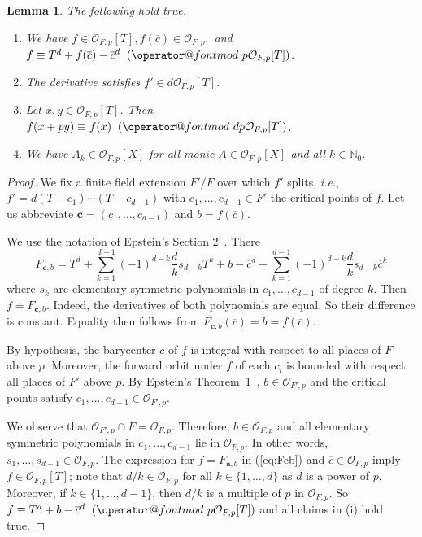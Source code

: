 \documentclass[12pt,oneside,a4]{amsart}
\makeatletter
\newcommand{\IN}{\mathbb{N}}
\newcommand{\cO}{\mathcal{O}}
\newcounter{maincounter}
\numberwithin{maincounter}{section}
\numberwithin{equation}{section}
\newtheorem{lemma}[maincounter]{Lemma}
\def\imod#1{\allowbreak\mkern10mu({\operator@font mod}\,\,#1)}
\makeatother
\begin{document}
\begin{lemma}
  \label{lem:epstein}
  The following hold true.
  \begin{enumerate}
  \item [(i)]  We have $f\in \cO_{F,p}[T], f(\overline c)\in
    \cO_{F,p},$     and $f\equiv T^d+ f(\overline c)- \overline c^d
    \imod {p \cO_{F,p}[T]}$.
  \item[(ii)] The derivative satisfies $f' \in d \cO_{F,p}[T]$. 
  \item[(iii)] Let $x,y\in \cO_{F,p}[T]$. Then $f(x+py) \equiv f(x) \imod{dp
      \cO_{F,p}[T]}$. 
  \item[(iv)] We have
    $A_k\in \cO_{F,p}[X]$ for all monic $A\in \cO_{F,p}[X]$ and
    all $k\in\IN_0$.
  \end{enumerate}
\end{lemma}
\begin{proof}
  We fix a finite field extension $F'/F$ over which $f'$ splits,
  \textit{i.e.}, $f' = d(T-c_1)\cdots(T-c_{d-1})$ with
  $c_1,\ldots,c_{d-1}\in F'$ the critical points of $f$.
  Let us abbreviate $\mathbf{c}=(c_1,\ldots,c_{d-1})$ and
  $b=f(\overline{c})$.
  
  We use the notation of Epstein's Section 2~\cite{epstein:12}. 
  There
  \begin{equation}
    \label{eq:Fcb}
    F_{\mathbf{c},b} = T^d + \sum_{k=1}^{d-1} (-1)^{d-k}
    \frac{d}{k}s_{d-k} T^k +
    b - \overline{c}^d - \sum_{k=1}^{d-1} (-1)^{d-k}
    \frac{d}{k}s_{d-k} \overline{c}^k
  \end{equation}
  where $s_{k}$ are elementary symmetric polynomials in
  $c_1,\ldots,c_{d-1}$ of  degree $k$.
  Then $f = F_{\mathbf{c},b}$.
  Indeed, the derivatives of both polynomials
  are equal. So their difference is
  constant. Equality then follows from  $F_{\mathbf{c},b}(\overline
  c)=b=f(\overline c)$.
  
  By hypothesis, the barycenter $\overline c$ of $f$
  is integral with respect to all places
  of $F$ above $p$. Moreover, the forward
  orbit under $f$ of each $c_i$ is bounded with
  respect all  places of $F'$ above $p$.
  By Epstein's Theorem~1~\cite{epstein:12},
  $b\in \cO_{F',p}$ and the critical points satisfy
  $c_1,\ldots,c_{d-1}\in\cO_{F',p}$.

  We observe that $\cO_{F',p}\cap F = \cO_{F,p}$. Therefore, $b\in
  \cO_{F,p}$ and all elementary symmetric polynomials in
  $c_1,\ldots,c_{d-1}$ lie in $\cO_{F,p}$. In other words,
  $s_1,\ldots,s_{d-1}\in\cO_{F,p}$.  The expression for
  $f=F_{\mathbf{a},b}$ in (\ref{eq:Fcb}) and $\overline c\in \cO_{F,p}$
  imply
  $f\in \cO_{F,p}[T]$;
  note that $d/k\in\cO_{F,p}$ for all $k\in \{1,\ldots,d\}$ as $d$ is
  a power of $p$.
  Moreover, if $k\in \{1,\ldots,d-1\}$,
  then $d/k$ is a multiple of $p$ in $\cO_{F,p}$. So $f\equiv T^d + b-
  \overline c^d \imod{p\cO_{F,p}[T]}$ and all claims in (i) hold true.


\end{proof}
\end{document}
